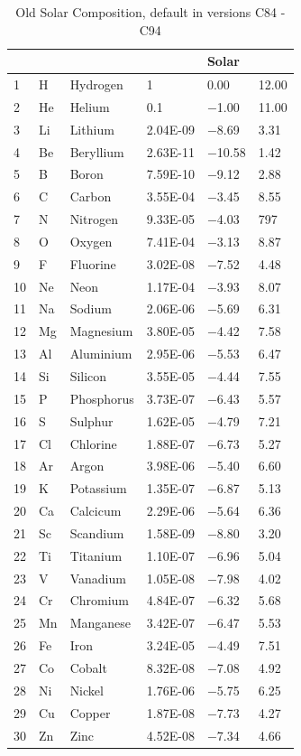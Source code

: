 \begin{table}
\centering
\caption{Old Solar Composition, default in versions C84 - C94}
\label{tab:CompositionSolarOld}
\begin{tabular}{llllll}
\hline
&&&&Solar\\
\hline
1& H& Hydrogen& 1& 0.00& 12.00\\
2& He& Helium& 0.1& $-$1.00& 11.00\\
3& Li& Lithium& 2.04E-09& $-$8.69& 3.31\\
4& Be& Beryllium&  2.63E-11& $-$10.58&1.42\\
5& B& Boron&  7.59E-10& $-$9.12&2.88\\
\hline
6& C& Carbon&  3.55E-04&$-$3.45& 8.55\\
7& N& Nitrogen& 9.33E-05& $-$4.03& 797\\
8& O& Oxygen& 7.41E-04& $-$3.13& 8.87\\
9& F& Fluorine& 3.02E-08&  $-$7.52&4.48\\
10& Ne& Neon& 1.17E-04& $-$3.93& 8.07\\
\hline
11& Na& Sodium& 2.06E-06& $-$5.69& 6.31\\
12& Mg& Magnesium& 3.80E-05& $-$4.42& 7.58\\
13& Al& Aluminium& 2.95E-06& $-$5.53& 6.47\\
14& Si& Silicon& 3.55E-05& $-$4.44& 7.55\\
15& P& Phosphorus& 3.73E-07& $-$6.43& 5.57\\
\hline
16& S& Sulphur& 1.62E-05& $-$4.79& 7.21\\
17& Cl& Chlorine& 1.88E-07& $-$6.73& 5.27\\
18& Ar& Argon& 3.98E-06& $-$5.40& 6.60\\
19& K& Potassium& 1.35E-07& $-$6.87& 5.13\\
20& Ca& Calcicum&  2.29E-06&$-$5.64& 6.36\\
\hline
21& Sc& Scandium&  1.58E-09&  $-$8.80& 3.20\\
22& Ti& Titanium&  1.10E-07& $-$6.96& 5.04\\
23& V& Vanadium& 1.05E-08& $-$7.98& 4.02\\
24& Cr& Chromium&  4.84E-07& $-$6.32& 5.68\\
25& Mn& Manganese& 3.42E-07& $-$6.47& 5.53\\
\hline
26& Fe& Iron& 3.24E-05& $-$4.49& 7.51\\
27& Co& Cobalt&  8.32E-08& $-$7.08& 4.92\\
28& Ni& Nickel&  1.76E-06& $-$5.75& 6.25\\
29& Cu& Copper& 1.87E-08& $-$7.73& 4.27\\
30& Zn& Zinc& 4.52E-08& $-$7.34& 4.66\\
\hline
\end{tabular}
\end{table}

